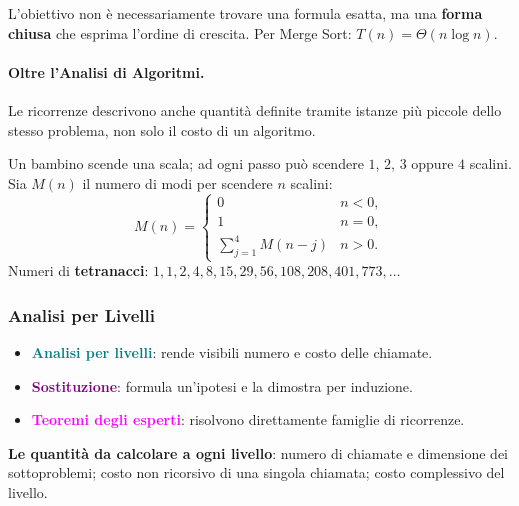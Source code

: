 \documentclass[12pt, a4paper]{article}
\begin{document}
\begin{tcolorbox}[colback=lightergray!5, colframe=tocsubsec, title=\textbf{Forma Chiusa}]
L'obiettivo non è necessariamente trovare una formula esatta, ma una \textbf{forma chiusa} che esprima l'ordine di crescita. Per Merge Sort: $T(n) = \Theta(n\log n)$.
\end{tcolorbox}

\paragraph{Oltre l'Analisi di Algoritmi.}
Le ricorrenze descrivono anche quantità definite tramite istanze più piccole dello stesso problema, non solo il costo di un algoritmo.

\begin{tcolorbox}[colback=lightergray!10, colframe=tocsec, title=\textbf{Esempio: Il Bambino sulle Scale}]
Un bambino scende una scala; ad ogni passo può scendere $1$, $2$, $3$ oppure $4$ scalini. Sia $M(n)$ il numero di modi per scendere $n$ scalini:
$$M(n) = \begin{cases} 0 & n<0, \\ 1 & n=0, \\ \displaystyle\sum_{j=1}^4 M(n-j) & n>0. \end{cases}$$
Numeri di \textbf{tetranacci}: $1,1,2,4,8,15,29,56,108,208,401,773,\ldots$
\end{tcolorbox}

\subsubsection{Analisi per Livelli}

\begin{tcolorbox}[colback=lightergray!10, colframe=tocsec, title=\textbf{Tre Metodi Complementari}]
\label{prop:tre-metodi-ricorrenze}
\begin{itemize}
    \item \textcolor{teal}{\textbf{Analisi per livelli}}: rende visibili numero e costo delle chiamate.
    \item \textcolor{purple}{\textbf{Sostituzione}}: formula un'ipotesi e la dimostra per induzione.
    \item \textcolor{magenta}{\textbf{Teoremi degli esperti}}: risolvono direttamente famiglie di ricorrenze.
\end{itemize}
\end{tcolorbox}

\textbf{Le quantità da calcolare a ogni livello}: numero di chiamate e dimensione dei sottoproblemi; costo non ricorsivo di una singola chiamata; costo complessivo del livello.
\end{document}
